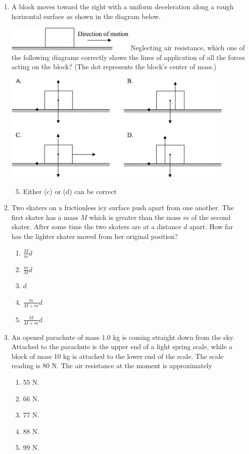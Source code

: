 \documentclass[12pt,letterpaper]{article}
\begin{document}
\begin{enumerate}
\vfill
\newpage

\item
A block moves toward the right with a uniform deceleration along a rough horizontal surface as shown in the diagram below.

\includegraphics[width=0.5\textwidth,center]{block-q-lg.png}
Neglecting air resistance, which one of the following diagrams correctly shows the lines of application of all the forces acting on the block? (The dot represents the block's center of mass.)

\includegraphics[width=0.9\textwidth,center]{block-ans.png}
\begin{enumerate}
\setcounter{enumii}{4}
\item Either (c) or (d) can be correct
\end{enumerate}

\item
Two skaters on a frictionless icy surface push apart from one another. The first skater has a mass $M$ which is greater than the mass $m$ of the second skater. After some time the two skaters are at a distance $d$ apart. How far has the lighter skater moved from her original position?
\begin{enumerate}[itemsep=10pt]
\item $\displaystyle \frac{M}{m}d$
\item $\displaystyle \frac{m}{M}d$
\item $d$
\item $\displaystyle \frac{m}{M+m}d$
\item $\displaystyle \frac{M}{M+m}d$
\end{enumerate}

\vfill
\newpage

\item
An opened parachute of mass 1.0 kg is coming straight down from the sky. Attached to the parachute is the upper end of a light spring scale, while a block of mass 10 kg is attached to the lower end of the scale. The scale reading is 80 N. The air resistance at the moment is approximately
\begin{enumerate}
\item 55 N.
\item 66 N.
\item 77 N.
\item 88 N.
\item 99 N.
\end{enumerate}


\end{enumerate}
\end{document}
